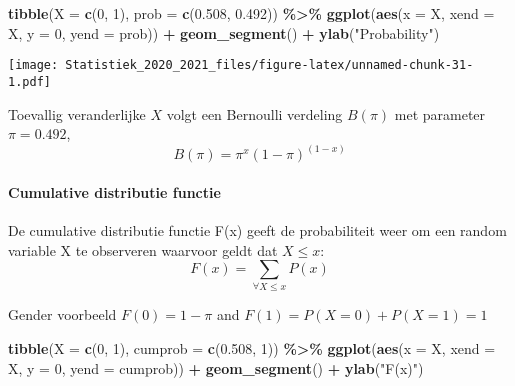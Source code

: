 \documentclass[
  12pt,dutch,coursenotes]{book}
\newenvironment{Shaded}{\begin{snugshade}}{\end{snugshade}}
\newcommand{\DataTypeTok}[1]{\textcolor[rgb]{0.13,0.29,0.53}{#1}}
\newcommand{\DecValTok}[1]{\textcolor[rgb]{0.00,0.00,0.81}{#1}}
\newcommand{\FloatTok}[1]{\textcolor[rgb]{0.00,0.00,0.81}{#1}}
\newcommand{\KeywordTok}[1]{\textcolor[rgb]{0.13,0.29,0.53}{\textbf{#1}}}
\newcommand{\NormalTok}[1]{#1}
\newcommand{\OperatorTok}[1]{\textcolor[rgb]{0.81,0.36,0.00}{\textbf{#1}}}
\newcommand{\StringTok}[1]{\textcolor[rgb]{0.31,0.60,0.02}{#1}}
\theoremstyle{definition}
\theoremstyle{definition}
\theoremstyle{definition}
\theoremstyle{remark}
\begin{document}
\begin{Shaded}
\begin{Highlighting}[]
\KeywordTok{tibble}\NormalTok{(}\DataTypeTok{X =} \KeywordTok{c}\NormalTok{(}\DecValTok{0}\NormalTok{, }\DecValTok{1}\NormalTok{), }\DataTypeTok{prob =} \KeywordTok{c}\NormalTok{(}\FloatTok{0.508}\NormalTok{, }\FloatTok{0.492}\NormalTok{)) }\OperatorTok{\%\textgreater{}\%}\StringTok{ }\KeywordTok{ggplot}\NormalTok{(}\KeywordTok{aes}\NormalTok{(}\DataTypeTok{x =}\NormalTok{ X, }
    \DataTypeTok{xend =}\NormalTok{ X, }\DataTypeTok{y =} \DecValTok{0}\NormalTok{, }\DataTypeTok{yend =}\NormalTok{ prob)) }\OperatorTok{+}\StringTok{ }\KeywordTok{geom\_segment}\NormalTok{() }\OperatorTok{+}\StringTok{ }
\StringTok{    }\KeywordTok{ylab}\NormalTok{(}\StringTok{"Probability"}\NormalTok{)}
\end{Highlighting}
\end{Shaded}

\texttt{[image: Statistiek\_2020\_2021\_files/figure-latex/unnamed-chunk-31-1.pdf]}

Toevallig veranderlijke \(X\) volgt een Bernoulli verdeling \(B(\pi)\) met parameter \(\pi=0.492\),
\[B(\pi)= \pi^x(1-\pi)^{(1-x)}\]

\hypertarget{cumulative-distributie-functie}{%
\paragraph{Cumulative distributie functie}\label{cumulative-distributie-functie}}

De cumulative distributie functie F(x) geeft de probabiliteit weer om een random variable X te observeren waarvoor geldt dat \(X\leq x\):
\[ F(x) = \sum\limits_{\forall X\leq x} P(x)\]

Gender voorbeeld \(F(0)=1-\pi\) and \(F(1)= P(X=0) + P(X=1)=1\)

\begin{Shaded}
\begin{Highlighting}[]
\KeywordTok{tibble}\NormalTok{(}\DataTypeTok{X =} \KeywordTok{c}\NormalTok{(}\DecValTok{0}\NormalTok{, }\DecValTok{1}\NormalTok{), }\DataTypeTok{cumprob =} \KeywordTok{c}\NormalTok{(}\FloatTok{0.508}\NormalTok{, }\DecValTok{1}\NormalTok{)) }\OperatorTok{\%\textgreater{}\%}\StringTok{ }\KeywordTok{ggplot}\NormalTok{(}\KeywordTok{aes}\NormalTok{(}\DataTypeTok{x =}\NormalTok{ X, }
    \DataTypeTok{xend =}\NormalTok{ X, }\DataTypeTok{y =} \DecValTok{0}\NormalTok{, }\DataTypeTok{yend =}\NormalTok{ cumprob)) }\OperatorTok{+}\StringTok{ }\KeywordTok{geom\_segment}\NormalTok{() }\OperatorTok{+}\StringTok{ }
\StringTok{    }\KeywordTok{ylab}\NormalTok{(}\StringTok{"F(x)"}\NormalTok{)}
\end{Highlighting}
\end{Shaded}
\end{document}
